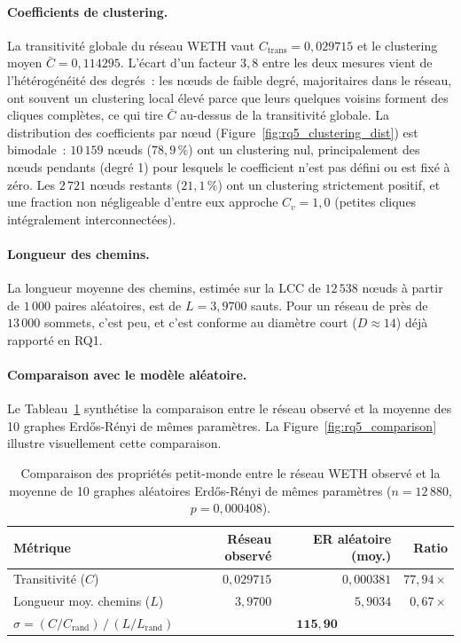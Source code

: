 \paragraph{Coefficients de clustering.}
La transitivit\'e globale du r\'eseau WETH vaut $C_{\text{trans}} = 0{,}029715$ et le clustering moyen $\bar{C} = 0{,}114295$. L'\'ecart d'un facteur $3{,}8$ entre les deux mesures vient de l'h\'et\'erog\'en\'eit\'e des degr\'es~: les n\oe{}uds de faible degr\'e, majoritaires dans le r\'eseau, ont souvent un clustering local \'elev\'e parce que leurs quelques voisins forment des cliques compl\`etes, ce qui tire $\bar{C}$ au-dessus de la transitivit\'e globale. La distribution des coefficients par n\oe{}ud (Figure~\ref{fig:rq5_clustering_dist}) est bimodale~: $10\,159$ n\oe{}uds ($78{,}9\,\%$) ont un clustering nul, principalement des n\oe{}uds pendants (degr\'e 1) pour lesquels le coefficient n'est pas d\'efini ou est fix\'e \`a z\'ero. Les $2\,721$ n\oe{}uds restants ($21{,}1\,\%$) ont un clustering strictement positif, et une fraction non n\'egligeable d'entre eux approche $C_v = 1{,}0$ (petites cliques int\'egralement interconnect\'ees).

\paragraph{Longueur des chemins.}
La longueur moyenne des chemins, estim\'ee sur la LCC de $12\,538$ n\oe{}uds \`a partir de $1\,000$ paires al\'eatoires, est de $L = 3{,}9700$ sauts. Pour un r\'eseau de pr\`es de $13\,000$ sommets, c'est peu, et c'est conforme au diam\`etre court ($D \approx 14$) d\'ej\`a rapport\'e en RQ1.

\paragraph{Comparaison avec le mod\`ele al\'eatoire.}
Le Tableau~\ref{tab:rq5_comparison} synth\'etise la comparaison entre le r\'eseau observ\'e et la moyenne des 10 graphes Erd\H{o}s-R\'enyi de m\^emes param\`etres. La Figure~\ref{fig:rq5_comparison} illustre visuellement cette comparaison.

\begin{table}[H]
\centering
\caption{Comparaison des propri\'et\'es petit-monde entre le r\'eseau WETH observ\'e et la moyenne de 10 graphes al\'eatoires Erd\H{o}s-R\'enyi de m\^emes param\`etres ($n = 12\,880$, $p = 0{,}000408$).}
\label{tab:rq5_comparison}
\begin{tabular}{lrrr}
\toprule
M\'etrique & R\'eseau observ\'e & ER al\'eatoire (moy.) & Ratio \\
\midrule
Transitivit\'e ($C$) & $0{,}029715$ & $0{,}000381$ & $77{,}94\times$ \\
Longueur moy. chemins ($L$) & $3{,}9700$ & $5{,}9034$ & $0{,}67\times$ \\
\midrule
$\sigma = (C/C_{\text{rand}}) \,/\, (L/L_{\text{rand}})$ & \multicolumn{3}{c}{$\mathbf{115{,}90}$} \\
\bottomrule
\end{tabular}
\end{table}

